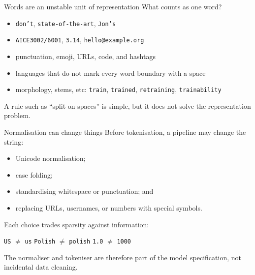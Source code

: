 \begin{frame}{Words are an unstable unit of representation}
  What counts as one word?

  \begin{itemize}
    \item \texttt{don't}, \texttt{state-of-the-art}, \texttt{Jon's}
    \item \texttt{AICE3002/6001}, \texttt{3.14}, \texttt{hello@example.org}
    \item punctuation, emoji, URLs, code, and hashtags
    \item languages that do not mark every word boundary with a space
    \item morphology, stems, etc: \texttt{train}, \texttt{trained},
      \texttt{retraining}, \texttt{trainability}
  \end{itemize}

  A rule such as ``split on spaces'' is simple, but it does not solve the
  representation problem.
\end{frame}

\begin{frame}{Normalisation can change things}
  Before tokenisation, a pipeline may change the string:
  \begin{itemize}
    \item Unicode normalisation;
    \item case folding;
    \item standardising whitespace or punctuation; and
    \item replacing URLs, usernames, or numbers with special symbols.
  \end{itemize}

  Each choice trades sparsity against information:
  \begin{center}
    \texttt{US} $\neq$ \texttt{us}
    \qquad
    \texttt{Polish} $\neq$ \texttt{polish}
    \qquad
    \texttt{1.0} $\neq$ \texttt{1000}
  \end{center}

  The normaliser and tokeniser are therefore part of the model specification,
  not incidental data cleaning.
\end{frame}

